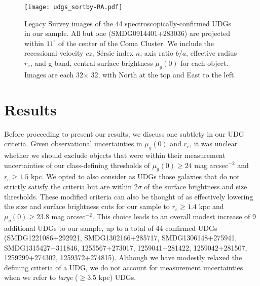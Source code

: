 \documentclass[twocolumn,tighten]{aastex63}
\begin{document}
\twocolumngrid


\begin{figure*}
\texttt{[image: udgs\_sortby-RA.pdf]}
\caption{Legacy Survey images of the 44 spectroscopically-confirmed UDGs in our sample. All but one (SMDG0914401+283036)
are projected within $11^\circ$ of the center of the Coma Cluster. We include the recessional velocity $cz$, S\'{e}rsic index $n$, axis ratio $b/a$, effective radius $r_e$, and g-band, central surface brightness $\mu_g(0)$ for each object. Images are each 32\arcsec $\times$ 32\arcsec, with North at the top and East to the left.}
\label{fig:udgs}
\end{figure*}



\section{Results}
\label{sec:discussion}

Before proceeding to present our results, we discuss one subtlety in our UDG criteria. Given observational uncertainties in $\mu_g(0)$ and $r_e$, it was unclear whether we should exclude objects that were within their measurement uncertainties of our class-defining thresholds of $\mu_g(0) \ge 24$ mag arcsec$^{-2}$ and $r_e \geq 1.5$ kpc. We opted to 
 also consider as UDGs those galaxies that do not strictly satisfy the criteria but are within 2$\sigma$ of the surface brightness and size thresholds. These modified criteria can also be thought of as effectively lowering the size and surface brightness cuts for our sample to $r_e \geq 1.4$ kpc and $\mu_g(0) \geq 23.8$ mag arcsec$^{-2}$. This choice leads to an overall modest increase of 9 additional UDGs to our sample, up to a total of 44 confirmed UDGs (SMDG1221086+292921, SMDG1302166+285717, SMDG1306148+275941, SMDG1315427+311846, 1255567+273017, 1259041+281422,  1259042+281507, 1259299+274302, 1259372+274815). Although we have modestly relaxed the defining criteria of a UDG, we do not account for measurement uncertainties when we refer to \textit{large} ($\geq3.5$ kpc) UDGs.
\end{document}
